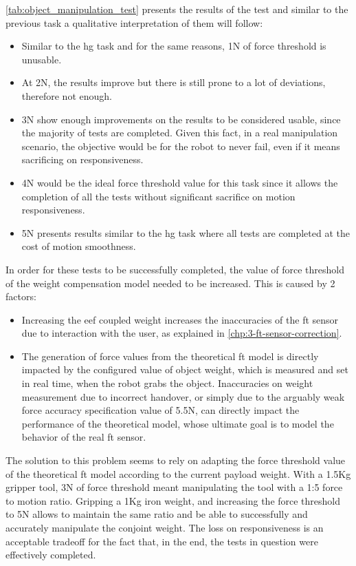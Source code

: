 \par \autoref{tab:object_manipulation_test} presents the results of the test and similar to the previous task a qualitative interpretation of them will follow: 
\begin{itemize}
    \item Similar to the \ac{hg} task and for the same reasons, 1N of force threshold is unusable.
    \item At 2N, the results improve but there is still prone to a lot of deviations, therefore not enough.
    \item 3N show enough improvements on the results to be considered usable, since the majority of tests are completed. Given this fact, in a real manipulation scenario, the objective would be for the robot to never fail, even if it means sacrificing on responsiveness.
    \item 4N would be the ideal force threshold value for this task since it allows the completion of all the tests without significant sacrifice on motion responsiveness.
    \item 5N presents results similar to the \ac{hg} task where all tests are completed at the cost of motion smoothness.
\end{itemize}

\par In order for these tests to be successfully completed, the value of force threshold of the weight compensation model needed to be increased. This is caused by 2 factors: 

\begin{itemize}
    \item Increasing the \ac{eef} coupled weight increases the inaccuracies of the \ac{ft} sensor due to interaction with the user, as explained in \autoref{chp:3-ft-sensor-correction}.
    \item The generation of force values from the theoretical \ac{ft} model is directly impacted by the configured value of object weight, which is measured and set in real time, when the robot grabs the object. Inaccuracies on weight measurement due to incorrect handover, or simply due to the arguably weak force accuracy specification value of 5.5N, can directly impact the performance of the theoretical model, whose ultimate goal is to model the behavior of the real \ac{ft} sensor.
\end{itemize}

\par The solution to this problem seems to rely on adapting the force threshold value of the theoretical \ac{ft} model according to the current payload weight. With a 1.5Kg gripper tool, 3N of force threshold meant manipulating the tool with a 1:5 force to motion ratio. Gripping a 1Kg iron weight, and increasing the force threshold to 5N allows to maintain the same ratio and be able to successfully and accurately manipulate the conjoint weight. The loss on responsiveness is an acceptable tradeoff for the fact that, in the end, the tests in question were effectively completed. 

